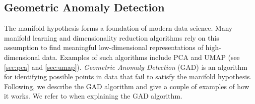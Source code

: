 \subsection{Geometric Anomaly Detection}
\label{sec:geometric-anomaly-detection}
The manifold hypothesis forms a foundation of modern data science. Many manifold learning and dimensionality reduction algorithms rely on this assumption to find meaningful low-dimensional representations of high-dimensional data. Examples of such algorithms include PCA and UMAP (see \cref{sec:pca} and \cref{sec:umap}). \textit{Geometric Anomaly Detection} (GAD) \cite{stolz2020geometric} is an algorithm for identifying possible points in data that fail to satisfy the manifold hypothesis. Following, we describe the GAD algorithm and give a couple of examples of how it works. We refer to \cite{stolz2020geometric} when explaining the GAD algorithm.

